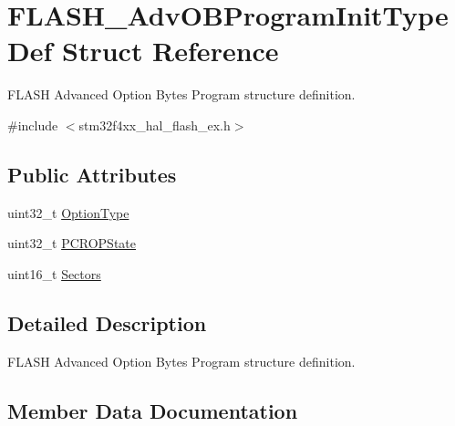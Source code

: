 \hypertarget{struct_f_l_a_s_h___adv_o_b_program_init_type_def}{}\section{F\+L\+A\+S\+H\+\_\+\+Adv\+O\+B\+Program\+Init\+Type\+Def Struct Reference}
\label{struct_f_l_a_s_h___adv_o_b_program_init_type_def}


F\+L\+A\+SH Advanced Option Bytes Program structure definition.  




{\ttfamily \#include $<$stm32f4xx\+\_\+hal\+\_\+flash\+\_\+ex.\+h$>$}

\subsection*{Public Attributes}
\begin{DoxyCompactItemize}
\item 
uint32\+\_\+t \hyperlink{struct_f_l_a_s_h___adv_o_b_program_init_type_def_addc57691b6721cfa8b62092e72e9b775}{Option\+Type}
\item 
uint32\+\_\+t \hyperlink{struct_f_l_a_s_h___adv_o_b_program_init_type_def_ac673a803fde49ba1fdd2c04110a46be2}{P\+C\+R\+O\+P\+State}
\item 
uint16\+\_\+t \hyperlink{struct_f_l_a_s_h___adv_o_b_program_init_type_def_a4b5fc72d81e2edbf413df808a3c3d68c}{Sectors}
\end{DoxyCompactItemize}


\subsection{Detailed Description}
F\+L\+A\+SH Advanced Option Bytes Program structure definition. 

\subsection{Member Data Documentation}

